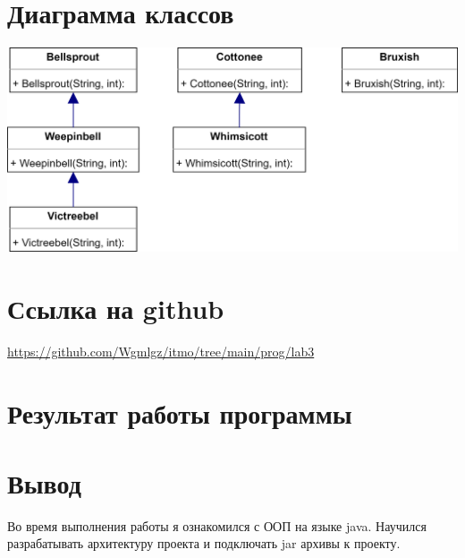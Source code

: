 \documentclass{article}
\begin{document}
\section{Диаграмма классов}

\begin{center}
  \includegraphics[scale=0.2]{diagram.png}
\end{center}

\section{Ссылка на github}
\url{https://github.com/Wgmlgz/itmo/tree/main/prog/lab3}
\section{Результат работы программы}
\section{Вывод}
Во время выполнения работы я ознакомился с ООП на языке java. Научился разрабатывать архитектуру проекта и подключать jar архивы к проекту.
\end{document}
